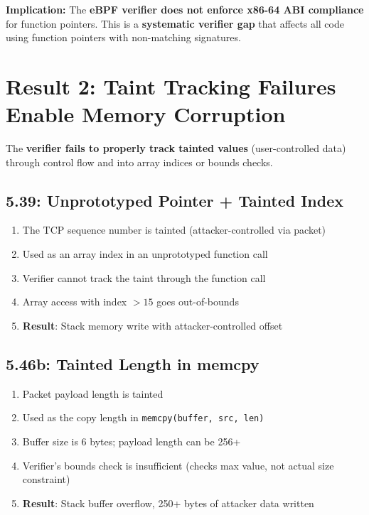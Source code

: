 \textbf{Implication:}
The \textbf{eBPF verifier does not enforce x86-64 ABI compliance} for function pointers. This is a \textbf{systematic verifier gap} that affects all code using function pointers with non-matching signatures.

\section{Result 2: Taint Tracking Failures Enable Memory Corruption}

The \textbf{verifier fails to properly track tainted values} (user-controlled data) through control flow and into array indices or bounds checks.

\subsection{5.39: Unprototyped Pointer + Tainted Index}

\begin{enumerate}[label=\arabic*.]
  \item The TCP sequence number is tainted (attacker-controlled via packet)
  \item Used as an array index in an unprototyped function call
  \item Verifier cannot track the taint through the function call
  \item Array access with index $> 15$ goes out-of-bounds
  \item \textbf{Result}: Stack memory write with attacker-controlled offset
\end{enumerate}

\subsection{5.46b: Tainted Length in memcpy}

\begin{enumerate}[label=\arabic*.]
  \item Packet payload length is tainted
  \item Used as the copy length in \texttt{memcpy(buffer, src, len)}
  \item Buffer size is 6 bytes; payload length can be 256+
  \item Verifier's bounds check is insufficient (checks max value, not actual size constraint)
  \item \textbf{Result}: Stack buffer overflow, 250+ bytes of attacker data written
\end{enumerate}

